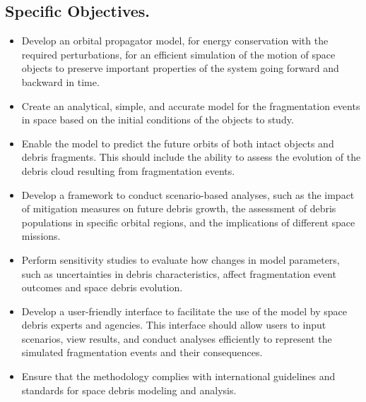 \documentclass[11pt]{article} %
\begin{document}
\subsection{Specific Objectives.}
\begin{itemize}
    \item Develop an orbital propagator model, for energy conservation with the required perturbations, for an efficient simulation of the motion of space objects to preserve important properties of the system going forward and backward in time.
    \item Create an analytical, simple, and accurate model for the fragmentation events in space based on the initial conditions of the objects to study.
    \item Enable the model to predict the future orbits of both intact objects and debris fragments. This should include the ability to assess the evolution of the debris cloud resulting from fragmentation events.
    \item Develop a framework to conduct scenario-based analyses, such as the impact of mitigation measures on future debris growth, the assessment of debris populations in specific orbital regions, and the implications of different space missions.
    \item Perform sensitivity studies to evaluate how changes in model parameters, such as uncertainties in debris characteristics, affect fragmentation event outcomes and space debris evolution.
    \item Develop a user-friendly interface to facilitate the use of the model by space debris experts and agencies. This interface should allow users to input scenarios, view results, and conduct analyses efficiently to represent the simulated fragmentation events and their consequences.
    \item Ensure that the methodology complies with international guidelines and standards for space debris modeling and analysis.
\end{itemize}


\end{document}
